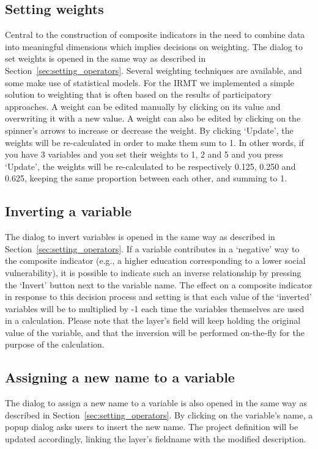 \subsection{Setting weights}

Central to the construction of composite indicators in the need to combine data
into meaningful dimensions which implies decisions on weighting. The dialog to
set weights is opened in the same way as described in
Section~\ref{sec:setting_operators}. Several weighting techniques are
available, and some make use of statistical models.  For the IRMT we
implemented a simple solution to weighting that is often based on the results
of participatory approaches. A weight can be edited manually by clicking on its
value and overwriting it with a new value. A weight can also be edited by
clicking on the spinner's arrows to increase or decrease the weight.  By
clicking `Update', the weights will be re-calculated in order to make them sum
to 1. In other words, if you have 3 variables and you set their weights to 1, 2
and 5 and you press `Update', the weights will be re-calculated to be
respectively 0.125, 0.250 and 0.625, keeping the same proportion between each
other, and summing to 1.


\subsection{Inverting a variable}

The dialog to invert variables is opened in the same way as described in
Section~\ref{sec:setting_operators}. If a variable contributes in a `negative'
way to the composite indicator (e.g., a higher education corresponding to a
lower social vulnerability), it is possible to indicate such an inverse
relationship by pressing the `Invert' button next to the variable name. The
effect on a composite indicator in response to this decision process and
setting is that each value of the `inverted' variables will be to multiplied by
-1 each time the variables themselves are used in a calculation.  Please note
that the layer's field will keep holding the original value of the variable,
and that the inversion will be performed on-the-fly for the purpose of the
calculation.


\subsection{Assigning a new name to a variable}

The dialog to assign a new name to a variable is also opened in the same way as
described in Section~\ref{sec:setting_operators}. By clicking on the variable's
name, a popup dialog asks users to insert the new name. The project definition
will be updated accordingly, linking the layer's fieldname with the modified
description.


